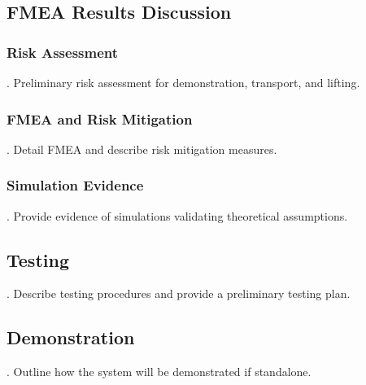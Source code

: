 \subsection{FMEA Results Discussion}
\subsubsection{Risk Assessment}
.  Preliminary risk assessment for demonstration, transport, and lifting.
\subsubsection{FMEA and Risk Mitigation}
.  Detail FMEA and describe risk mitigation measures.
\subsubsection{Simulation Evidence}
.  Provide evidence of simulations validating theoretical assumptions.

\subsection{Testing}
.  Describe testing procedures and provide a preliminary testing plan.

\subsection{Demonstration}
.  Outline how the system will be demonstrated if standalone.